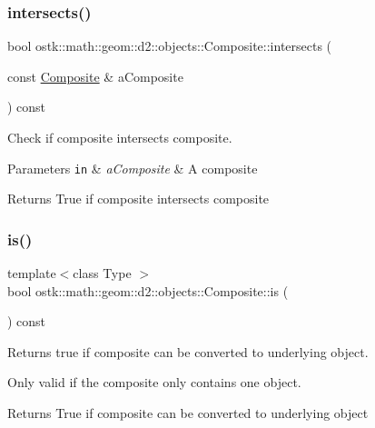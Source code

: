 \subsubsection{\texorpdfstring{intersects()}{intersects()}\hspace{0.1cm}{\footnotesize\ttfamily [2/2]}}
{\footnotesize\ttfamily bool ostk\+::math\+::geom\+::d2\+::objects\+::\+Composite\+::intersects (\begin{DoxyParamCaption}\item[{const \hyperlink{classostk_1_1math_1_1geom_1_1d2_1_1objects_1_1_composite}{Composite} \&}]{a\+Composite }\end{DoxyParamCaption}) const}



Check if composite intersects composite. 


\begin{DoxyParams}[1]{Parameters}
\mbox{\tt in}  & {\em a\+Composite} & A composite \\
\hline
\end{DoxyParams}
\begin{DoxyReturn}{Returns}
True if composite intersects composite 
\end{DoxyReturn}
\mbox{\label{classostk_1_1math_1_1geom_1_1d2_1_1objects_1_1_composite_acc537c1d540fbc9538244ce4f04c90c7}} 
\subsubsection{\texorpdfstring{is()}{is()}}
{\footnotesize\ttfamily template$<$class Type $>$ \\
bool ostk\+::math\+::geom\+::d2\+::objects\+::\+Composite\+::is (\begin{DoxyParamCaption}{ }\end{DoxyParamCaption}) const\hspace{0.3cm}{\ttfamily [inline]}}



Returns true if composite can be converted to underlying object. 

Only valid if the composite only contains one object.

\begin{DoxyReturn}{Returns}
True if composite can be converted to underlying object 
\end{DoxyReturn}
\mbox{\label{classostk_1_1math_1_1geom_1_1d2_1_1objects_1_1_composite_a6e14791f29bae236167d05de6cbd7b96}} 
